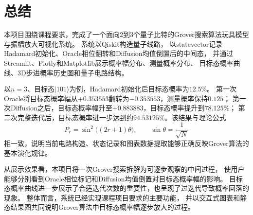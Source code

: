 \section{总结}

本项目围绕课程要求，完成了一个面向2到3个量子比特的Grover搜索算法玩具模型与振幅放大可视化系统。
系统以Qiskit构造量子线路，
以statevector记录Hadamard初始化、Oracle相位翻转和Diffusion均值倒置后的中间态，
并通过Streamlit、Plotly和Matplotlib展示概率幅分布、测量概率分布、
目标态概率曲线、3D步进概率历史图和量子电路结构。

以\(n=3\)、目标态\(|101\rangle\)为例，Hadamard初始化后目标态概率为\(12.5\%\)。
第一次Oracle将目标态概率幅从\(+0.353553\)翻转为\(-0.353553\)，测量概率保持\(0.125\)；
第一次Diffusion之后，目标态概率幅升至\(+0.883883\)，目标态概率提升到\(78.125\%\)；
第二次完整迭代后，目标态概率进一步达到约\(94.53125\%\)。该结果与理论公式
\[
    P_r=\sin^2\big((2r+1)\theta\big),\qquad \sin\theta=\frac{1}{\sqrt{N}}
\]
相一致，说明当前电路构造、状态记录和图表数据提取能够正确反映Grover算法的基本演化规律。

从展示效果看，本项目将一次Grover搜索拆解为可逐步观察的中间过程，
使用户能够分别看到Oracle相位标记和Diffusion均值倒置对目标态概率幅的影响。
目标态概率曲线进一步展示了合适迭代次数的重要性，也呈现了过迭代导致概率回落的现象。
整体而言，系统已经实现课程项目要求的主要功能，
并以交互式图表和静态结果图共同说明Grover算法中目标态概率幅逐步放大的过程。

